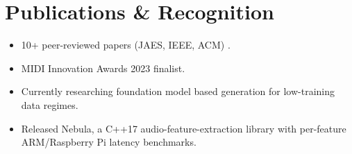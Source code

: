 \documentclass[11pt]{article}
\begin{document}
\section*{Publications \& Recognition}
\begin{itemize}[leftmargin=1.2em, itemsep=-0.25em]
    \item 10+ peer-reviewed papers (JAES, IEEE, ACM) {}.
    \item MIDI Innovation Awards 2023 finalist.
    
    \item Currently researching foundation model based generation for low-training data regimes.
    \item Released Nebula, a C++17 audio-feature-extraction library with per-feature ARM/Raspberry Pi latency benchmarks.
\end{itemize}
\end{document}

